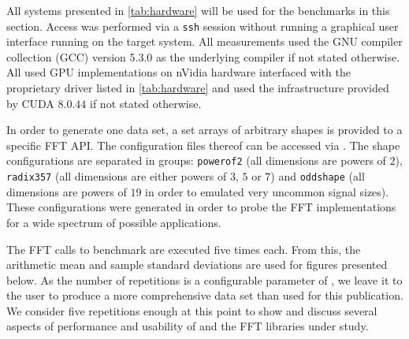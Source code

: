 
All systems presented in \cref{tab:hardware} will be used for the benchmarks in this section. Access was performed via a \texttt{ssh} session without running a graphical user interface running on the target system. All measurements used the GNU compiler collection (GCC) version 5.3.0 as the underlying compiler if not stated otherwise. All used GPU implementations on nVidia hardware interfaced with the proprietary driver listed in \cref{tab:hardware} and used the infrastructure provided by CUDA $8.0.44$ if not stated otherwise. 

In order to generate one data set, a set arrays of arbitrary shapes is provided to a specific FFT API. The configuration files thereof can be accessed via \cite{gearshifft_github}. The shape configurations are separated in groups: \texttt{powerof2} (all dimensions are powers of $2$), \texttt{radix357} (all dimensions are either powers of $3$, $5$ or $7$) and \texttt{oddshape} (all dimensions are powers of $19$ in order to emulated very uncommon signal sizes). These configurations were generated in order to probe the FFT implementations for a wide spectrum of possible applications.  

The FFT calls to benchmark are executed five times each. From this, the arithmetic mean and sample standard deviations are used for figures presented below. As the number of repetitions is a configurable parameter of \gearshifft{}, we leave it to the user to produce a more comprehensive data set than used for this publication. We consider five repetitions enough at this point to show and discuss several aspects of performance and usability of \gearshifft{} and the FFT libraries under study.  

